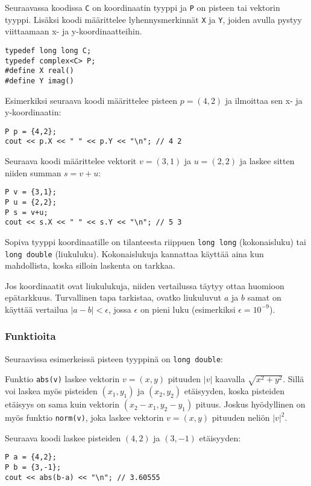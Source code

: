 Seuraavassa koodissa \texttt{C} on koordinaatin tyyppi
ja \texttt{P} on pisteen tai vektorin tyyppi.
Lisäksi koodi määrittelee
lyhennysmerkinnät \texttt{X} ja \texttt{Y},
joiden avulla pystyy viittaamaan x- ja y-koordinaatteihin.

\begin{lstlisting}
typedef long long C;
typedef complex<C> P;
#define X real()
#define Y imag()
\end{lstlisting}

Esimerkiksi seuraava koodi määrittelee pisteen $p=(4,2)$
ja ilmoittaa sen x- ja y-koordinaatin:

\begin{lstlisting}
P p = {4,2};
cout << p.X << " " << p.Y << "\n"; // 4 2
\end{lstlisting}

Seuraava koodi määrittelee vektorit $v=(3,1)$
ja $u=(2,2)$ ja laskee sitten niiden summan $s=v+u$:

\begin{lstlisting}
P v = {3,1};
P u = {2,2};
P s = v+u;
cout << s.X << " " << s.Y << "\n"; // 5 3
\end{lstlisting}

Sopiva tyyppi koordinaatille on tilanteesta
riippuen \texttt{long long} (kokonaisluku)
tai \texttt{long double} (liukuluku).
Kokonaislukuja kannattaa käyttää aina kun mahdollista,
koska silloin laskenta on tarkkaa.

Jos koordinaatit ovat liukulukuja,
niiden vertailussa täytyy ottaa huomioon epätarkkuus.
Turvallinen tapa tarkistaa,
ovatko liukuluvut $a$ ja $b$ samat
on käyttää vertailua $|a-b|<\epsilon$, jossa $\epsilon$
on pieni luku (esimerkiksi $\epsilon=10^{-9}$).

\subsubsection*{Funktioita}

Seuraavissa esimerkeissä pisteen tyyppinä on
\texttt{long double}:

Funktio \texttt{abs(v)} laskee vektorin $v=(x,y)$
pituuden $|v|$ kaavalla $\sqrt{x^2+y^2}$.
Sillä voi laskea myös pisteiden $(x_1,y_1)$
ja $(x_2,y_2)$ etäisyyden,
koska pisteiden etäisyys
on sama kuin vektorin $(x_2-x_1,y_2-y_1)$ pituus.
Joskus hyödyllinen on myös funktio \texttt{norm(v)},
joka laskee vektorin $v=(x,y)$ pituuden neliön $|v|^2$.

Seuraava koodi laskee
pisteiden $(4,2)$ ja $(3,-1)$ etäisyyden:
\begin{lstlisting}
P a = {4,2};
P b = {3,-1};
cout << abs(b-a) << "\n"; // 3.60555
\end{lstlisting}

